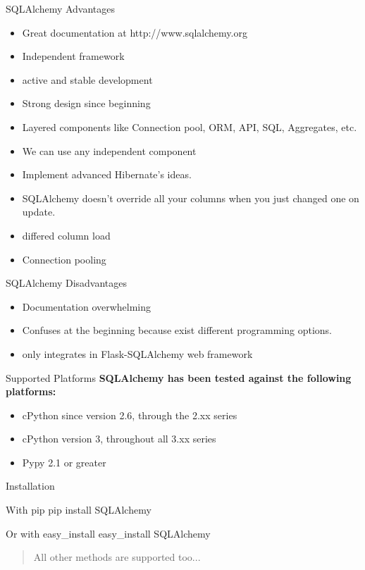 \documentclass[seagull]{beamer}
\begin{document}
\begin{frame}{SQLAlchemy Advantages }
\begin{itemize}
	\item Great documentation at http://www.sqlalchemy.org
	\item Independent framework
	\item active and stable development    
	\item Strong design since beginning
	\item Layered components like Connection pool, ORM, API, SQL, Aggregates, etc.
	\item We can use any independent component  
	\item Implement advanced Hibernate's ideas.
	\item SQLAlchemy doesn't override all your columns when you just changed one on update.
	\item differed column load
	\item Connection pooling
\end{itemize}
\end{frame}

\begin{frame}{SQLAlchemy Disadvantages}
\begin{itemize}
	\item Documentation overwhelming
	\item Confuses at the beginning because exist different programming options.
	\item only integrates in Flask-SQLAlchemy web framework
\end{itemize}
\end{frame}

\begin{frame}{Supported Platforms}
	\textbf{SQLAlchemy has been tested against the following platforms:}
	\begin{itemize}
		\item cPython since version 2.6, through the 2.xx series
		\item cPython version 3, throughout all 3.xx series
		\item Pypy 2.1 or greater
	\end{itemize}
\end{frame}
\begin{frame}{Installation}
	\begin{block}{With pip}
		pip install SQLAlchemy
	\end{block} 
	\begin{block}{Or with easy\_install}
		easy\_install SQLAlchemy
	\end{block}
	\begin{quote}
	All other methods are supported too...
	\end{quote}
\end{frame}
\end{document}
